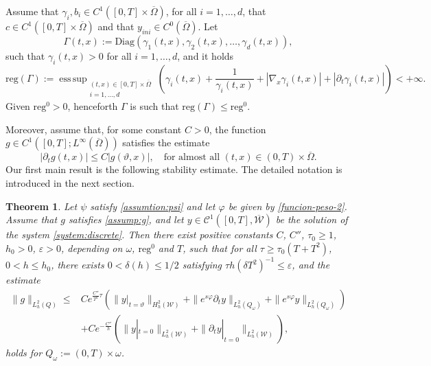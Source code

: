 \documentclass{amsart}
\numberwithin{equation}{section}
\DeclareMathOperator*{\esssup}{ess\,sup}
\newtheorem{theorem}{Theorem}[section]
\begin{document}
 Assume that $\gamma_i,b_i\in C^1([0,T]\times \overline{\Omega})$, for all $i=1,\ldots,d$, that $c\in C^1([0,T]\times \overline{\Omega})$ and that $y_{ini}\in C^0(\overline{\Omega})$. Let
$$\Gamma(t,x):= \mathrm{Diag}(\gamma_{1}(t,x),\gamma_{2}(t,x),\ldots, \gamma_{d}(t,x)),$$ such that $\gamma_{i}(t,x)>0$ for all $i=1,\ldots,d$, and it holds
\begin{equation*}
    \mbox {reg}(\Gamma):= \esssup_{
    \begin{array}{c}
    (t,x)\in [0,T]\times\overline{\Omega}\\
    i=1,\ldots,d    
    \end{array}
    }\left( \gamma_{i}(t,x)+\frac{1}{\gamma_{i}(t,x)}+|\nabla_{x}\gamma_{i}(t,x)|+|\partial_t\gamma_{i}(t,x)|\right)<+\infty.
\end{equation*} 
Given $\mbox{reg}^{0}>0$, henceforth $\Gamma$ is such that $\mathrm{reg}(\Gamma)\leq\mbox{reg}^{0}$. 

Moreover, assume that, for some constant $C>0$, the function $g\in C^1([0,T];L^\infty(\overline{\Omega}))$ satisfies the estimate
    \begin{equation}\label{assump:g}
        |\partial_{t}g(t,x)|\le C|g(\vartheta,x)|, \quad \text{for almost all }(t,x)\in(0,T)\times\overline{\Omega}.
    \end{equation} 
Our first main result is the following stability estimate. The detailed notation is introduced in the next section. 
\begin{theorem}\label{theo:stability}
    	 Let $\psi$ satisfy \eqref{assumtion:psi} and let $\varphi$ be given by \eqref{funcion-peso-2}. Assume that $g$ satisfies \eqref{assump:g}, and let $y\in \mathcal{C}^{1}([0,T],\overline{\mathcal{W}})$ be the solution of the system \eqref{system:discrete}. Then there exist positive constants $C$, $C''$, $\tau_{0}\geq 1$, $h_{0}>0$, $\varepsilon >0$, depending on $\omega$, $\mathrm{reg}^{0}$ and $T$, such that for all $\tau\geq \tau_{0}(T+T^{2})$, $0<h\leq h_{0}$, there exists $0<\delta(h) \leq 1/2$ satisfying $\tau h(\delta T^{2})^{-1}\leq \varepsilon$, and the estimate
		\begin{equation*}
        \begin{aligned}
		    \|g\|_{L_h^{2}(Q)}\leq &Ce^{\frac{C''}{T^2}\tau}\left(\|y|_{t=\vartheta}\|_{H_h^2(\mathcal{W})}+\|e^{s\varphi}\partial_{t}y\|_{L_h^2(Q_\omega)}+\|e^{s\varphi}y\|_{L_h^2(Q_\omega)}\right)\\
            &+Ce^{-\frac{C''}{h}}\left(\|y|_{t=0}\|_{L^2_h(\mathcal{W})}+\|\partial_{t}y|_{t=0}\|_{L^2_h(\mathcal{W})}\right),
            \end{aligned}
		\end{equation*} 
		  holds for $Q_{\omega}:= (0,T)\times\omega$.
\end{theorem}
\end{document}
